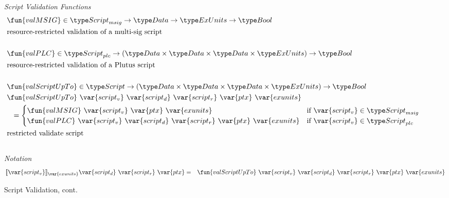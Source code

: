 %
\begin{figure*}[htb]
  \emph{Script Validation Functions}
  \begin{align*}
    & \fun{valMSIG} \in \ScriptMSig\to \Data \to \ExUnits \to\Bool \\
    & \text{resource-restricted validation of a multi-sig script} \\~\\
    & \fun{valPLC} \in \ScriptPlutus\to (\Data \times \Data \times \Data \times
    \ExUnits) \to \Bool \\
    & \text{resource-restricted validation of a Plutus script} \\~\\
    & \fun{valScriptUpTo} \in \Script\to (\Data \times \Data \times \Data \times \ExUnits)
    \to\Bool \\
    & \fun{valScriptUpTo}~\var{script_v} ~ \var{script_d}~\var{script_r}~\var{ptx}~\var{exunits} \\
    &~~= \begin{cases}
              \fun{valMSIG} ~\var{script_v} ~\var{ptx}~\var{exunits}
               & \text{if}~\var{script_v} \in \ScriptMSig \\
              \fun{valPLC} ~\var{script_v} ~ \var{script_d}~\var{script_r}~\var{ptx}~\var{exunits} & \text{if}~
               \var{script_v} \in \ScriptPlutus
          \end{cases}
    \\ & \text{restricted validate script} \\~\\
  \end{align*}
  \emph{Notation}
  \begin{align*}
    \llbracket \var{script_v} \rrbracket_{\var{exunits}} \var{script_d}~\var{script_r}~\var{ptx}
    &=& \fun{valScriptUpTo} ~\var{script_v} ~ \var{script_d}~\var{script_r}~\var{ptx}~
    \var{exunits}
  \end{align*}
  \caption{Script Validation, cont.}
  \label{fig:defs:functions-valid}
\end{figure*}


\clearpage
